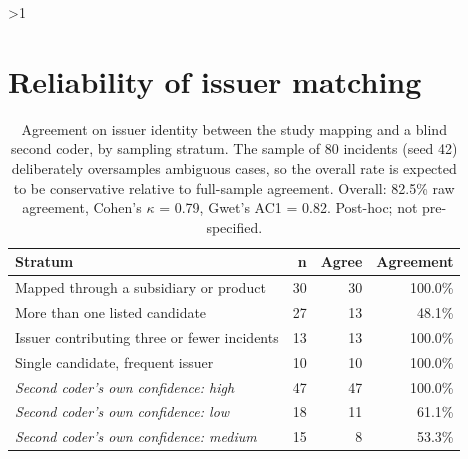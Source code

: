 \documentclass[11pt]{article}
\let\oldsection\section
\newcounter{supsec}
\renewcommand{\section}[1]{\stepcounter{supsec}\ifnum\value{supsec}>1\clearpage\fi\oldsection*{#1}}
\begin{document}
\section{Reliability of issuer matching}
\begin{table}[H]
\caption{Agreement on issuer identity between the study mapping and a blind second coder, by sampling stratum. The sample of 80 incidents (seed 42) deliberately oversamples ambiguous cases, so the overall rate is expected to be conservative relative to full-sample agreement. Overall: 82.5\% raw agreement, Cohen's $\kappa$ = 0.79, Gwet's AC1 = 0.82. Post-hoc; not pre-specified.}
\label{tab:entrel}
\centering\small
\begin{tabular}{@{}lrrr@{}}
\toprule
Stratum & n & Agree & Agreement \\ \midrule
Mapped through a subsidiary or product & 30 & 30 & 100.0\% \\
More than one listed candidate & 27 & 13 & 48.1\% \\
Issuer contributing three or fewer incidents & 13 & 13 & 100.0\% \\
Single candidate, frequent issuer & 10 & 10 & 100.0\% \\
\midrule
\emph{Second coder's own confidence: high} & 47 & 47 & 100.0\% \\
\emph{Second coder's own confidence: low} & 18 & 11 & 61.1\% \\
\emph{Second coder's own confidence: medium} & 15 & 8 & 53.3\% \\
\bottomrule
\end{tabular}
\end{table}
\end{document}
